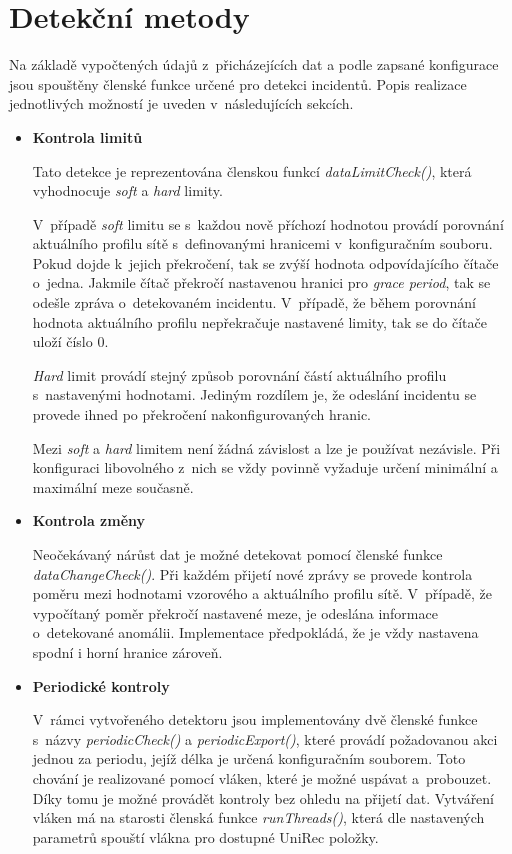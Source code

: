 \section{Detekční metody} \label{detectMethods}
 Na základě vypočtených údajů z~přicházejících dat a podle zapsané konfigurace jsou spouštěny
 členské funkce určené pro detekci incidentů. Popis realizace jednotlivých možností je uveden
 v~následujících sekcích.
 
\begin{itemize}
 \item \textbf{Kontrola limitů}
 
 Tato detekce je reprezentována členskou funkcí \textit{dataLimitCheck()}, která vyhodnocuje
 \textit{soft} a \textit{hard} limity. 
 
 V~případě \textit{soft} limitu se s~každou nově příchozí hodnotou provádí
 porovnání aktuálního profilu sítě s~definovanými hranicemi v~konfiguračním souboru. Pokud dojde
 k~jejich překročení, tak se zvýší hodnota odpovídajícího čítače o~jedna. Jakmile čítač překročí nastavenou 
 hranici pro \textit{grace period}, tak se odešle zpráva o~detekovaném incidentu. V~případě, že 
 během porovnání hodnota aktuálního profilu nepřekračuje nastavené limity, tak se do čítače uloží 
 číslo 0.
 
 \textit{Hard} limit provádí stejný způsob porovnání částí aktuálního profilu s~nastavenými hodnotami. Jediným
 rozdílem je, že odeslání incidentu se provede ihned po překročení nakonfigurovaných hranic.
 
 Mezi \textit{soft} a \textit{hard} limitem není žádná závislost a lze je používat nezávisle. Při konfiguraci 
 libovolného z~nich se vždy povinně vyžaduje určení minimální a maximální meze současně.
 
 \item \textbf{Kontrola změny}
 
 Neočekávaný nárůst dat je možné detekovat pomocí členské funkce \textit{dataChangeCheck()}.
 Při každém přijetí nové zprávy se provede kontrola poměru mezi hodnotami vzorového a aktuálního
 profilu sítě. V~případě, že vypočítaný poměr překročí nastavené meze, je odeslána informace 
 o~detekované anomálii. Implementace předpokládá, že je vždy nastavena spodní i horní hranice
 zároveň.
 
 \item \textbf{Periodické kontroly}
 
 V~rámci vytvořeného detektoru jsou implementovány dvě členské funkce s~názvy
 \textit{periodicCheck()} a \textit{periodicExport()}, které provádí požadovanou akci jednou
 za periodu, jejíž délka je určená konfiguračním souborem. Toto chování je realizované pomocí 
 vláken, které je možné uspávat a~probouzet. Díky tomu je možné provádět kontroly bez ohledu
 na přijetí dat. Vytváření vláken má na starosti členská funkce
 \textit{runThreads()}, která dle nastavených parametrů spouští vlákna pro dostupné UniRec položky.
 

\end{itemize}
